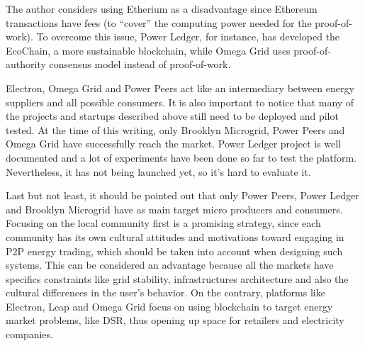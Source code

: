 The author considers using Etherium as a disadvantage since Ethereum transactions have fees (to “cover” the computing power needed for the proof-of-work). To overcome this issue, Power Ledger, for instance, has developed the EcoChain, a more sustainable blockchain, while Omega Grid uses proof-of-authority consensus model instead of proof-of-work.



Electron, Omega Grid and Power Peers act like an intermediary between energy suppliers and all possible consumers. It is also important to notice that many of the projects and startups described above still need to be deployed and pilot tested. At the time of this writing, only Brooklyn Microgrid, Power Peers and Omega Grid have successfully reach the market. Power Ledger project is well documented and a lot of experiments have been done so far to test the platform. Nevertheless, it has not being launched yet, so it’s hard to evaluate it.



Last but not least, it should be pointed out that only Power Peers, Power Ledger and Brooklyn Microgrid have as main target micro producers and consumers. Focusing on the local community first is a promising strategy, since each community has its own cultural attitudes and motivations toward engaging in P2P energy trading, which should be taken into account when designing such systems. This can be considered an advantage because all the markets have specifics constraints like grid stability, infrastructures architecture and also the cultural differences in the user’s behavior. On the contrary, platforms like Electron, Leap and Omega Grid focus on using blockchain to target energy market problems, like \ac{DSR}, thus opening up space for retailers and electricity companies.   
